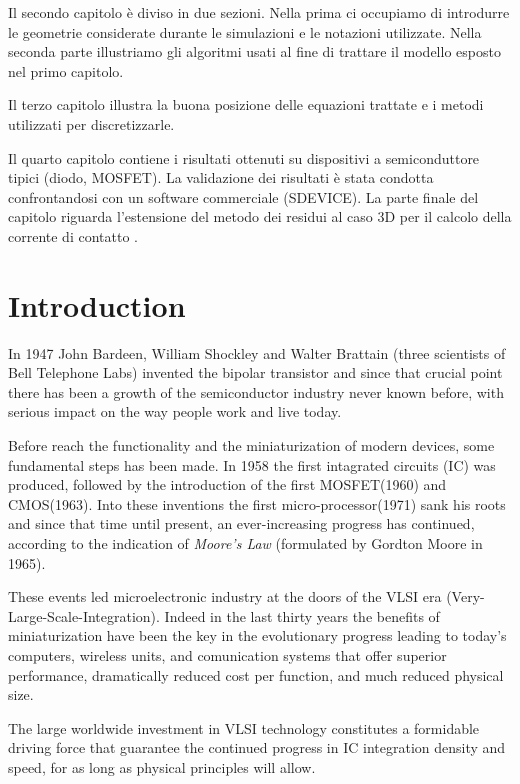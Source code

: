 Il secondo capitolo \`e diviso in due sezioni. Nella prima ci occupiamo di introdurre le geometrie considerate durante le simulazioni e le notazioni utilizzate. Nella seconda parte illustriamo gli algoritmi usati al fine di trattare il modello esposto nel primo capitolo.

Il terzo capitolo illustra la buona posizione delle equazioni trattate e i metodi utilizzati per discretizzarle.

Il quarto capitolo contiene i risultati ottenuti su dispositivi a semiconduttore tipici (diodo, MOSFET). La validazione dei risultati \`e stata condotta confrontandosi con un software commerciale (SDEVICE). La parte finale del capitolo riguarda l'estensione del metodo dei residui al caso 3D per il calcolo della corrente di contatto \cite{ContactCurrentRM}.



\chapter{Introduction}

In 1947 John Bardeen, William Shockley and Walter Brattain (three scientists of Bell Telephone Labs) invented the bipolar transistor and since that crucial point there has been a growth  of the semiconductor industry never known before, with serious impact on the way people work and live today. 

Before reach the functionality and the miniaturization of modern devices, some fundamental steps has been made.
In 1958 the first intagrated circuits (IC) was produced, followed by the introduction of the first MOSFET(1960) and CMOS(1963). Into these inventions the first micro-processor(1971) sank his roots  and since that time until present, an ever-increasing progress has continued, according to the indication of \textit{Moore's Law} (formulated by Gordton Moore in 1965).

These events led microelectronic industry at the doors of the VLSI era (Very-Large-Scale-Integration). Indeed in the last thirty years the benefits of miniaturization have been the key in the evolutionary progress leading to today's computers, wireless units, and comunication systems that offer superior performance, dramatically reduced cost per function, and much reduced physical size.

The large worldwide investment in VLSI technology constitutes a formidable driving force that guarantee the continued progress in IC integration density and speed, for as long as physical principles will allow.

